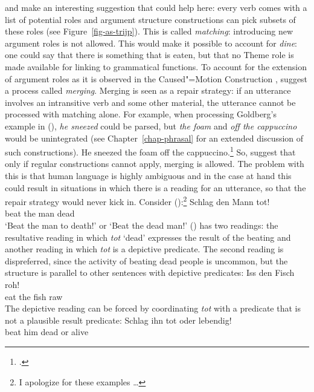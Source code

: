  and \citet{SvT2011a} make an interesting suggestion that could help
here: every verb comes with a list of potential roles and argument structure constructions can pick
subsets of these roles (see Figure~\ref{fig-as-trijp}). This is called \emph{matching}: introducing new argument roles is not allowed. 
This would make it possible to account for \emph{dine}: one could
say that there is something that is eaten, but that no Theme role is made available for linking to
grammatical functions. To account for the extension of argument roles as it is observed in the
Caused"=Motion Construction \citep[Chapter~7]{Goldberg95a}, \citet{SvT2011a} suggest a process called \emph{merging}. Merging is seen
as a repair strategy: if an utterance involves an intransitive verb and some other material, the
utterance cannot be processed with matching alone. For example, when processing Goldberg's example
in (), \emph{he sneezed} could be parsed, but \emph{the foam} and \emph{off the cappuccino}
would be unintegrated (see Chapter~\ref{chap-phrasal} for an extended discussion of such constructions).
\ea
He sneezed the foam off the cappuccino.\footnote{
.
}
\z
So, \citet[--320]{SvT2011a} suggest that only if regular constructions cannot apply, merging is
allowed. The problem with this is that human language is highly ambiguous and in the case
at hand this could result in situations in which there is a reading for an utterance, so that the
repair strategy would never kick in. Consider ():\footnote{
  I apologize for these examples \ldots
}
\ea
\label{ex-er-schlug-den-mann-tot}
\gll Schlag den Mann tot!\\
     beat   the man  dead\\
\glt `Beat the man to death!' or `Beat the dead man!'
\z
() has two readings: the resultative reading in which \emph{tot} `dead' expresses the result of the
beating and another reading in which \emph{tot} is a depictive predicate. The second reading is
dispreferred, since the activity of beating dead people is uncommon, but the structure is parallel to
other sentences with depictive predicates:
\ea
\gll Iss den Fisch roh!\\
     eat the fish raw\\
\z
The depictive reading can be forced by coordinating \emph{tot} with a predicate that is not a
plausible result predicate:
\ea
\gll Schlag ihn tot oder lebendig!\\
     beat   him dead or alive\\
